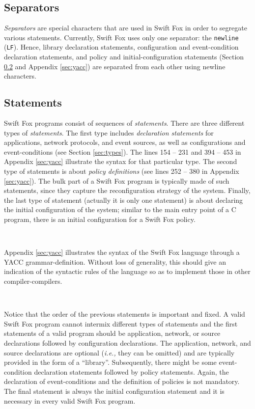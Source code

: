 \documentclass[11pt]{article}
\begin{document}
\subsection{Separators}
\label{sec:separators}

\textit{Separators} are special characters that are used in Swift Fox in
order to segregate various statements. Currently, Swift Fox uses only one
separator: the \texttt{newline} (\texttt{LF}). Hence, library declaration
statements, configuration and event-condition declaration statements, and
policy and initial-configuration statements (Section \ref{sec:statements}
and Appendix \ref{sec:yacc}) are separated from each other using newline
characters.

\subsection{Statements}
\label{sec:statements}

Swift Fox programs consist of sequences of \textit{statements}. There are
three different types of \textit{statements}. The first type includes
\textit{declaration statements} for applications, network protocols, and
event sources, as well as configurations and event-conditions (see Section 
\ref{sec:types}). The lines 154 -- 231 and 394 -- 453 in Appendix
\ref{sec:yacc} illustrate the syntax for that particular type. The second
type of statements is about \textit{policy definitions} (see lines 252 --
380 in Appendix \ref{sec:yacc}). The bulk part of a Swift Fox program is
typically made of such statements, since they capture the reconfiguration
strategy of the system. Finally, the last type of statement (actually it
is only one statement) is about declaring the initial configuration of the
system; similar to the main entry point of a C program, there is an initial
configuration for a Swift Fox policy.

\

\hangindent=4cm
\small
\noindent
Appendix \ref{sec:yacc} illustrates the syntax of the Swift Fox language
through a YACC grammar-definition. Without loss of generality, this should
give an indication of the syntactic rules of the language so as to
implement those in other compiler-compilers.
\normalsize

\

Notice that the order of the previous statements is important and fixed. A 
valid Swift Fox program cannot intermix different types of statements and
the first statements of a valid program should be application, network, or 
source declarations followed by configuration declarations. The
application, network, and source declarations are optional (\textit{i.e.,} 
they can be omitted) and are typically provided in the form of
a ``library''. Subsequently, there might be some event-condition
declaration statements followed by policy statements. Again, the
declaration of event-conditions and the definition of policies is not
mandatory. The final statement is always the initial configuration
statement and it is necessary in every valid Swift Fox program.
\end{document}
